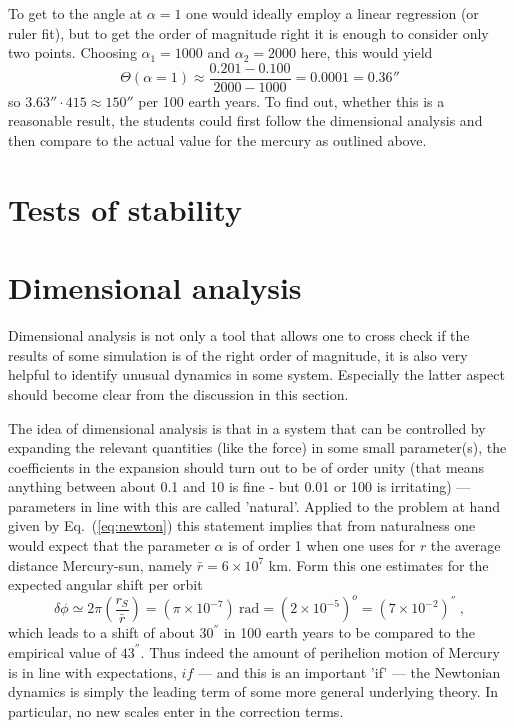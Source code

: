 \documentclass[12pt]{iopart}
\begin{document}
To get to the angle at $\alpha=1$ one would ideally employ a linear regression (or ruler fit), but to get the order of magnitude right it is enough to consider only two points.
Choosing $\alpha_1=1000$ and $\alpha_2=2000$ here, this would yield
\begin{equation}
	\Theta(\alpha=1) \approx \frac{0.201-0.100}{2000-1000} = 0.0001 = 0.36''
\end{equation}
so $3.63''\cdot 415\approx 150''$ per 100 earth years.
To find out, whether this is a reasonable result, the students could first follow the dimensional analysis and then compare to the actual value for the mercury  as outlined above.

\section{Tests of stability}\label{sec:stability}



\section{Dimensional analysis}\label{sec:analysis}

Dimensional analysis is not only a tool that allows one to cross check if the results of some simulation is
of the right order of magnitude, it is also very helpful to identify unusual dynamics in some system.
Especially the latter aspect should become clear from the discussion in this section.

The idea of dimensional analysis is that in a system that can be controlled by expanding the relevant quantities
(like the force) in some small parameter(s), the coefficients in the expansion should turn out to be of order unity (that
means anything between about 0.1 and 10 is fine - but 0.01 or 100 is irritating) --- parameters in line with this
are called 'natural'. Applied to the problem at hand
given by Eq.~(\ref{eq:newton}) this statement implies that from naturalness one would expect that 
the parameter $\alpha$ is of order 1 when one uses
for $r$ the average distance Mercury-sun, namely $\bar r=6\times 10^7$ km.
Form this one estimates for the expected angular shift per orbit
\begin{equation}
\delta \phi \simeq 2\pi\left(\frac{r_S}{\bar r}\right) = (\pi \times 10^{-7}) \ \mbox{rad} = (2\times 10^{-5})^o = (7\times 10^{-2}) ^{''} \ ,
\end{equation}
which leads to a shift of  about $30^{''}$ in 100 earth years to be compared to the empirical value of $43^{''}$.
 Thus indeed the
amount of perihelion motion of Mercury is in line with expectations, $if$ --- and this is an important 'if' ---
the Newtonian dynamics is simply the leading term of some more general underlying theory. In particular,
no new scales enter in the correction terms.
\end{document}
